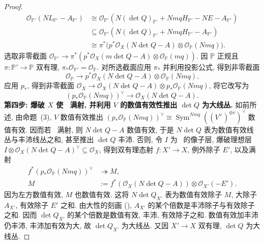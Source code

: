 \begin{proof}
\[\begin{aligned}
\mathcal O_{\mathbb P'}(NL_{\mathbb P'}-A_{\mathbb P'})
&\cong\mathcal O_{\mathbb P'}(N(\det Q)_{\mathbb P'}+NmqH_{\mathbb P'}-NE-A_{\mathbb P'})\\
&\subseteq\mathcal O_{\mathbb P'}(N(\det Q)_{\mathbb P'}+NmqH_{\mathbb P'}-A_{\mathbb P'})\\
&\cong\pi^*\bigl(p^*\mathcal O_X(N\det Q-A)\otimes\mathcal O_{\mathbb P}(Nmq)\bigr).
\end{aligned}
\]
选取非零截面 $\mathcal O_{\mathbb P'}\to\pi^*(p^*\mathcal O_X(m\det Q-A)\otimes\mathcal O_{\mathbb P}(mq))$. 因 $\mathbb P$ 正规且 $\pi:\mathbb P'\to\mathbb P$ 双有理, $\pi_*\mathcal O_{\mathbb P'}=\mathcal O_{\mathbb P}$. 对所选截面应用 $\pi_*$ 并利用投影公式, 得到非零截面
\[
\mathcal O_{\mathbb P}\longrightarrow p^*\mathcal O_X(N\det Q-A)\otimes\mathcal O_{\mathbb P}(Nmq).
\]
应用 $p_*$, 得到非零截面 $\mathcal O_X\to\mathcal O_X(N\det Q-A)\otimes p_*\mathcal O_{\mathbb P}(Nmq)$, 将它改写为
\begin{equation}\label{src:6.9.18}
(p_*\mathcal O_{\mathbb P}(Nmq))^\vee\longrightarrow\mathcal O_X(N\det Q-A).
\end{equation}
\textbf{第四步: 爆破 $X$ 使~ 满射, 并利用 $V$ 的数值有效性推出 $\det Q$ 为大线丛.} 如前所述, 由命题~(3), $V$ 数值有效推出 $(p_*\mathcal O_{\mathbb P}(Nmq))^\vee\cong\operatorname{Sym}^{Nmq}((V^\vee)^{\oplus v})^\vee$ 数值有效. 因而若~ 满射, 则 $N\det Q-A$ 数值有效, 于是 $N\det Q$ 表为数值有效线丛与丰沛线丛之和, 甚至推出 $\det Q$ 丰沛. 否则, 令 $I$ 为~ 的像子层, 爆破理想层 $I\otimes\mathcal O_X(N\det Q-A)^\vee\subseteq\mathcal O_X$, 得到双有理态射 $f:X'\to\allowbreak X$, 例外除子 $E'$, 以及满射
\[
\begin{aligned}
f^*(p_*\mathcal O_{\mathbb P}(Nmq))^\vee&\twoheadrightarrow M,\\
M&:=f^*(\mathcal O_X(N\det Q-A))\otimes\mathcal O_{X'}(-E').
\end{aligned}
\]
因为左方数值有效, $M$ 也数值有效. 这将 $N\det Q_{X'}$ 表为数值有效除子 $M$, 大除子 $A_{X'}$, 有效除子 $E'$ 之和. 由大性的刻画 (), $A_{X'}$ 的某个倍数是丰沛除子与有效除子之和. 因而 $\det Q_{X'}$ 的某个倍数是数值有效, 丰沛, 有效除子之和. 数值有效加丰沛仍丰沛, 丰沛加有效为大, 故 $\det Q_{X'}$ 为大线丛. 又因 $X'\to\allowbreak X$ 双有理, $\det Q$ 为大线丛.
\end{proof}
